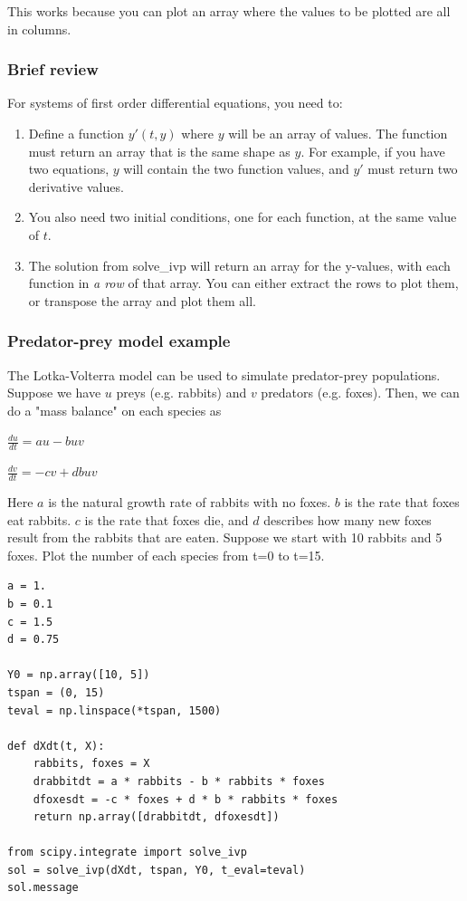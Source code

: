 \documentclass[11pt]{article}
\begin{document}
This works because you can plot an array where the values to be plotted are all in columns.

\subsubsection{Brief review}
\label{sec:org9e3a7d2}

For systems of first order differential equations, you need to:

\begin{enumerate}
\item Define a function \(y'(t, y)\) where \(y\) will be an array of values. The function must return an array that is the same shape as \(y\). For example, if you have two equations, \(y\) will contain the two function values, and \(y'\) must return two derivative values.
\item You also need two initial conditions, one for each function, at the same value of \(t\).
\item The solution from solve\_ivp will return an array for the y-values, with each function in \emph{a row} of that array. You can either extract the rows to plot them, or transpose the array and plot them all.
\end{enumerate}

\subsubsection{Predator-prey model example}
\label{sec:org741913d}

The Lotka-Volterra model can be used to simulate predator-prey populations. Suppose we have \(u\) preys (e.g. rabbits) and \(v\) predators (e.g. foxes). Then, we can do a "mass balance" on each species as

\(\frac{du}{dt} = a u - b u v\)

\(\frac{dv}{dt} = -c v + d b u v\)

Here \(a\) is the natural growth rate of rabbits with no foxes. \(b\) is the rate that foxes eat rabbits. \(c\) is the rate that foxes die, and \(d\) describes how many new foxes result from the rabbits that are eaten. Suppose we start with 10 rabbits and 5 foxes. Plot the number of each species from t=0 to t=15.

\begin{verbatim}
a = 1.
b = 0.1
c = 1.5
d = 0.75

Y0 = np.array([10, 5])
tspan = (0, 15)
teval = np.linspace(*tspan, 1500)

def dXdt(t, X):
    rabbits, foxes = X
    drabbitdt = a * rabbits - b * rabbits * foxes
    dfoxesdt = -c * foxes + d * b * rabbits * foxes
    return np.array([drabbitdt, dfoxesdt])

from scipy.integrate import solve_ivp
sol = solve_ivp(dXdt, tspan, Y0, t_eval=teval)
sol.message
\end{verbatim}
\end{document}
